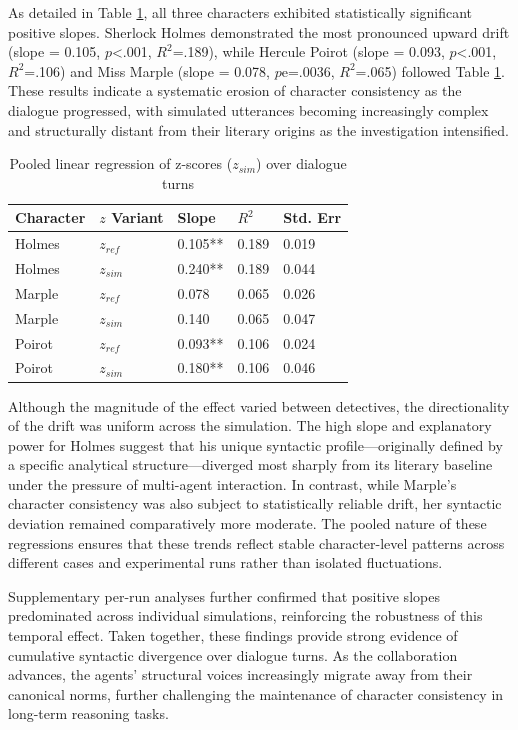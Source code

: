 \documentclass{article}
\begin{document}
As detailed in Table \ref{syntax_z}, all three characters exhibited statistically significant positive slopes. Sherlock Holmes demonstrated the most pronounced upward drift (slope = 0.105, $p$<.001, $R^2$=.189), while Hercule Poirot (slope = 0.093, $p$<.001, $R^2$=.106) and Miss Marple (slope = 0.078, $p$e=.0036, $R^2$=.065) followed Table \ref{syntax_z}. These results indicate a systematic erosion of character consistency as the dialogue progressed, with simulated utterances becoming increasingly complex and structurally distant from their literary origins as the investigation intensified.

\begin{table}[H]
\centering
\begin{tabular}{l l l l l}\toprule
Character & $z$ Variant& Slope & $R^2$& Std. Err \\\midrule
Holmes & $z_{ref}$& 0.105** & 0.189 & 0.019 \\
Holmes & $z_{sim}$& 0.240** & 0.189 & 0.044 \\
Marple & $z_{ref}$& 0.078 & 0.065 & 0.026 \\
Marple & $z_{sim}$& 0.140 & 0.065 & 0.047 \\
Poirot & $z_{ref}$& 0.093** & 0.106 & 0.024 \\
Poirot & $z_{sim}$& 0.180** & 0.106 & 0.046 \\ \bottomrule
\end{tabular}
\caption{Pooled linear regression of z-scores ($z_{sim}$) over dialogue turns}
\label{syntax_z}
\end{table}

Although the magnitude of the effect varied between detectives, the directionality of the drift was uniform across the simulation. The high slope and explanatory power for Holmes suggest that his unique syntactic profile—originally defined by a specific analytical structure—diverged most sharply from its literary baseline under the pressure of multi-agent interaction. In contrast, while Marple's character consistency was also subject to statistically reliable drift, her syntactic deviation remained comparatively more moderate.
The pooled nature of these regressions ensures that these trends reflect stable character-level patterns across different cases and experimental runs rather than isolated fluctuations. 

Supplementary per-run analyses further confirmed that positive slopes predominated across individual simulations, reinforcing the robustness of this temporal effect. Taken together, these findings provide strong evidence of cumulative syntactic divergence over dialogue turns. As the collaboration advances, the agents' structural voices increasingly migrate away from their canonical norms, further challenging the maintenance of character consistency in long-term reasoning tasks.
\end{document}
